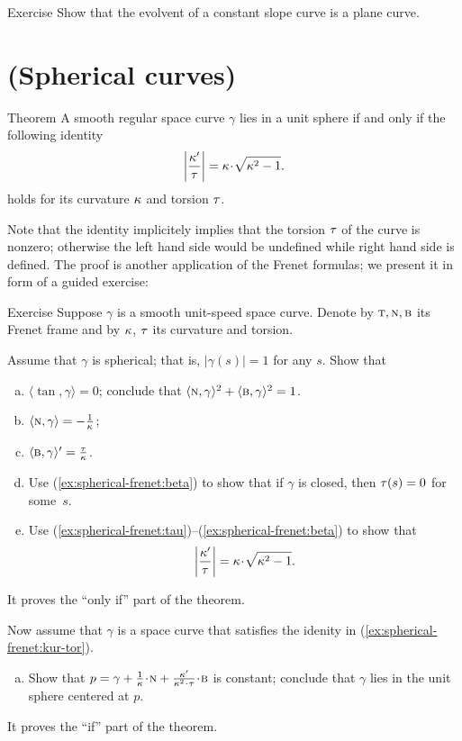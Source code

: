 \begin{thm}{Exercise}\label{ex:evolvent-constant-slope}
Show that the evolvent of a constant slope curve is a plane curve.
\end{thm}

\section{(Spherical curves)}

\begin{thm}{Theorem}
A smooth regular space curve $\gamma$ lies in a unit sphere if and only if 
the following identity 
\[\left|\frac{\kur'}{\tor}\right|=\kur\cdot\sqrt{\kur^2-1}.\]
holds for its curvature $\kappa$ and torsion $\tau$.
\end{thm}

Note that the identity implicitely implies that the torsion $\tau$ of the curve is nonzero;
otherwise the left hand side would be undefined while right hand side is defined.
The proof is another application of the Frenet formulas;
we present it in form of a guided exercise:

\begin{thm}{Exercise}\label{ex:spherical-frenet}
Suppose $\gamma$ is a smooth unit-speed space curve.
Denote by $\textsc{t},\textsc{n},\textsc{b}$ its Frenet frame and by $\kappa$, $\tau$ its curvature and torsion.

\smallskip

Assume that $\gamma$ is spherical; that is, $|\gamma(s)|=1$ for any $s$.
Show that

\begin{enumerate}[(a)]
\item\label{ex:spherical-frenet:tau} $\langle\tan,\gamma\rangle=0$; conclude that $\langle\textsc{n},\gamma\rangle^2+\langle\textsc{b},\gamma\rangle^2=1$.
\item\label{ex:spherical-frenet:nu} $\langle\textsc{n},\gamma\rangle=-\tfrac1{\kappa}$;
\item\label{ex:spherical-frenet:beta} $\langle\textsc{b},\gamma\rangle'=\tfrac{\tau}{\kappa}$.
\item\label{ex:spherical-frenet:beta+}
Use (\ref{ex:spherical-frenet:beta}) to show that if $\gamma$ is closed, then $\tau(s)=0$ for some~$s$.
\item\label{ex:spherical-frenet:kur-tor} Use (\ref{ex:spherical-frenet:tau})--(\ref{ex:spherical-frenet:beta}) to show that 
\[\left|\frac{\kur'}{\tor}\right|=\kur\cdot\sqrt{\kur^2-1}.\]
\setcounter{lastnumber}{\value{enumi}}
\end{enumerate}
It proves the ``only if'' part of the theorem.

\smallskip

Now assume that $\gamma$ is a space curve that satisfies the idenity in (\ref{ex:spherical-frenet:kur-tor}).
\begin{enumerate}[(a)]
\setcounter{enumi}{\value{lastnumber}}
\item Show that $p=\gamma+\tfrac1\kur\cdot \norm+\tfrac{\kur'}{\kur^2\cdot\tor}\cdot\bi$ is constant; conclude that $\gamma$ lies in the unit sphere centered at $p$.
\end{enumerate}
It proves the ``if'' part of the theorem.
\end{thm}

